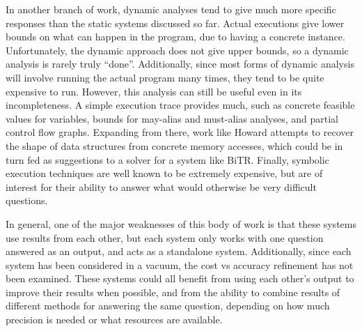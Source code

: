 In another branch of work, dynamic analyses tend to give much more specific responses than the static systems discussed so far.
Actual executions give lower bounds on what can happen in the program, due to having a concrete instance.
Unfortunately, the dynamic approach does not give upper bounds, so a dynamic analysis is rarely truly ``done''.
Additionally, since most forms of dynamic analysis will involve running the actual program many times, they tend to be quite expensive to run.
However, this analysis can still be useful even in its incompleteness.
A simple execution trace provides much, such as concrete feasible values for variables, bounds for may-alias and must-alias analyses, and partial control flow graphs.
Expanding from there, work like Howard attempts to recover the shape of data structures from concrete memory accesses, which could be in turn fed as suggestions to a solver for a system like BiTR.
Finally, symbolic execution techniques are well known to be extremely expensive, but are of interest for their ability to answer what would otherwise be very difficult questions.

In general, one of the major weaknesses of this body of work is that these systems use results from each other, but each system only works with one question answered as an output, and acts as a standalone system.
Additionally, since each system has been considered in a vacuum, the cost vs accuracy refinement has not been examined.
These systems could all benefit from using each other's output to improve their results when possible, and from the ability to combine results of different methods for answering the same question, depending on how much precision is needed or what resources are available.

